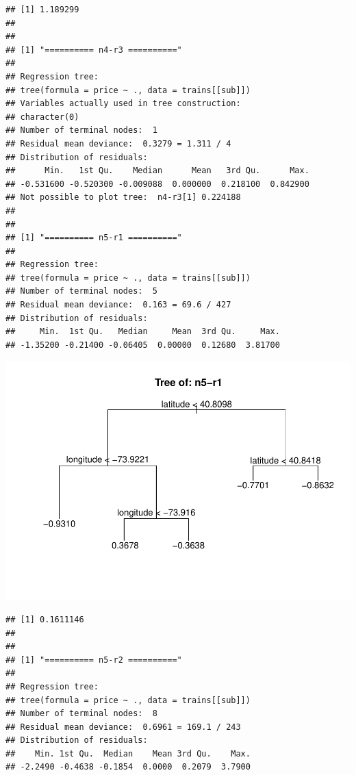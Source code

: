 \documentclass[
]{article}
\begin{document}
\begin{verbatim}
## [1] 1.189299
## 
## 
## [1] "========== n4-r3 =========="
## 
## Regression tree:
## tree(formula = price ~ ., data = trains[[sub]])
## Variables actually used in tree construction:
## character(0)
## Number of terminal nodes:  1 
## Residual mean deviance:  0.3279 = 1.311 / 4 
## Distribution of residuals:
##      Min.   1st Qu.    Median      Mean   3rd Qu.      Max. 
## -0.531600 -0.520300 -0.009088  0.000000  0.218100  0.842900 
## Not possible to plot tree:  n4-r3[1] 0.224188
## 
## 
## [1] "========== n5-r1 =========="
## 
## Regression tree:
## tree(formula = price ~ ., data = trains[[sub]])
## Number of terminal nodes:  5 
## Residual mean deviance:  0.163 = 69.6 / 427 
## Distribution of residuals:
##     Min.  1st Qu.   Median     Mean  3rd Qu.     Max. 
## -1.35200 -0.21400 -0.06405  0.00000  0.12680  3.81700
\end{verbatim}

\includegraphics{project-code_files/figure-latex/unnamed-chunk-14-17.pdf}

\begin{verbatim}
## [1] 0.1611146
## 
## 
## [1] "========== n5-r2 =========="
## 
## Regression tree:
## tree(formula = price ~ ., data = trains[[sub]])
## Number of terminal nodes:  8 
## Residual mean deviance:  0.6961 = 169.1 / 243 
## Distribution of residuals:
##    Min. 1st Qu.  Median    Mean 3rd Qu.    Max. 
## -2.2490 -0.4638 -0.1854  0.0000  0.2079  3.7900
\end{verbatim}
\end{document}

